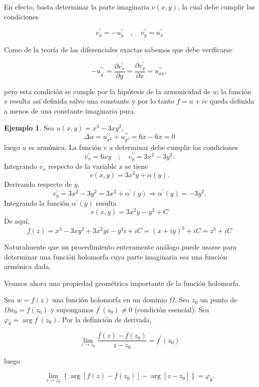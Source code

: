 \documentclass[10pt]{article}
\theoremstyle{plain}
\theoremstyle{definition}
\newtheorem{example}[theorem]{Ejemplo}
\theoremstyle{remark}
\begin{document}
En efecto, basta determinar la parte imaginaria $\nu(x, y)$, la cual debe cumplir las condiciones

$$
v_{x}^{\prime}=-u_{y}^{\prime} \quad, \quad v_{y}^{\prime}=u_{x}^{\prime}
$$

Como de la teoría de las diferenciales exactas sabemos que debe verificarse

$$
-u_{y^{\prime}}^{\prime \prime}=\frac{\partial v_{x}^{\prime}}{\partial y}=\frac{\partial v_{y}^{\prime}}{\partial x}=u_{x x}^{\prime \prime},
$$

pero esta condición se cumple por la hipótesis de la armonicidad de $u$; la función $v$ resulta así definida salvo una constante y por lo tanto $f=u+i v$ queda definida a menos de una constante imaginaria pura.

\begin{example}
Sea $u(x, y)=x^{3}-3 x y^{2}$,
$$\Delta u=u_{x^{2}}^{\prime \prime}+u_{y^{2}}^{\prime \prime}=6 x-6 x=0$$
luego $u$ es armónica. La función $v$ a determinar debe cumplir las condiciones
$$v_{x}^{\prime}=6 x y \quad ; \quad v_{y}^{\prime}=3 x^{2}-3 y^{2} .$$
Integrando $v_{x}$ respecto de la variable $x$ se tiene
$$v(x, y)=3 x^{2} y+\alpha(y) .$$
Derivando respecto de $y$,
$$v_{y}^{\prime}=3 x^{2}-3 y^{2}=3 x^{2}+\alpha^{\prime}(y) \Rightarrow \alpha^{\prime}(y)=-3 y^{2} .$$
Integrando la función $\alpha^{\prime}(y)$ resulta
$$v(x, y)=3 x^{2} y-y^{3}+C$$
De aquí,
$$f(z)=x^{3}-3 x y^{2}+3 x^{2} y i-y^{3} i+i C=(x+i y)^{3}+i C=z^{3}+i C$$
\end{example}

Naturalmente que un procedimiento enteramente análogo puede usarse para determinar una función holomorfa cuya parte imaginaria sea una función armónica dada.

Veamos ahora una propiedad geométrica importante de la función holomorfa.

Sea $w=f(z)$ una función holomorfa en un dominio $\Omega$. Sea $z_{0}$ un punto de $\Omega w_{0}=f\left(z_{0}\right)$ y supongamos $f^{\prime}\left(z_{0}\right) \neq 0$ (condición esencial). Sea $\varphi_{0}=\arg f^{\prime}\left(z_{0}\right)$. Por la defínición de derivada,

$$
\lim _{z \rightarrow z_{0}} \frac{f(z)-f\left(z_{0}\right)}{z-z_{0}}=f^{\prime}\left(z_{0}\right)
$$

luego


\begin{equation*}
\lim _{z \rightarrow z_{0}}\left\{\arg \left[f(z)-f\left(z_{0}\right)\right]-\arg \left[z-z_{0}\right]\right\}=\varphi_{0} . \tag{3-6}
\end{equation*}
\end{document}
